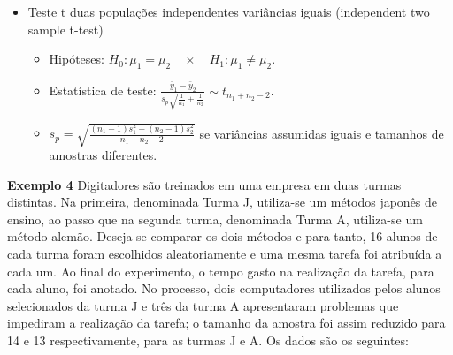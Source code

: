 \documentclass[
  10pt,
  a4paper]{book}
\providecommand{\tightlist}{%
  \setlength{\itemsep}{0pt}\setlength{\parskip}{0pt}}
\begin{document}
\begin{itemize}
\tightlist
\item
  Teste t duas populações independentes variâncias iguais (independent two sample t-test)

  \begin{itemize}
  \tightlist
  \item
    Hipóteses: \(H_0: \mu_1 = \mu_2 \quad \times \quad H_1: \mu_1 \neq \mu_2.\)
  \item
    Estatística de teste: \(\frac{\bar{y}_1 - \bar{y}_2}{s_p \sqrt{\frac{1}{n_1} + \frac{1}{n_2}}} \sim t_{n_1 + n_2-2}.\)
  \item
    \(s_p = \sqrt{\frac{(n_1 - 1)s^2_1 + (n_2 - 1)s^2_2}{n_1 + n_2 -2}}\) se variâncias assumidas iguais e tamanhos de amostras diferentes.
  \end{itemize}
\end{itemize}

\textbf{Exemplo 4} Digitadores são treinados em uma empresa em duas turmas distintas. Na primeira, denominada Turma J, utiliza-se um métodos japonês de ensino, ao passo que na segunda turma, denominada Turma A, utiliza-se um método alemão. Deseja-se comparar os dois métodos e para tanto, 16 alunos de cada turma foram escolhidos aleatoriamente e uma mesma tarefa foi atribuída a cada um. Ao final do experimento, o tempo gasto na realização da tarefa, para cada aluno, foi anotado. No processo, dois computadores utilizados pelos alunos selecionados da turma J e três da turma A apresentaram problemas que impediram a realização da tarefa; o tamanho da amostra foi assim reduzido para 14 e 13 respectivamente, para as turmas J e A. Os dados são os seguintes:
\end{document}

